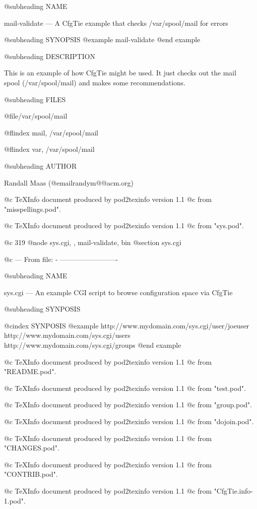 @subheading NAME


mail-validate --- A CfgTie example that checks /var/spool/mail for errors

@subheading SYNOPSIS
@example
        mail-validate
@end example

@subheading DESCRIPTION

This is an example of how CfgTie might be used.  It just checks out the mail
spool (/var/spool/mail) and makes some recommendations.

@subheading FILES

@file{/var/spool/mail}

@flindex mail, /var/spool/mail

@flindex var, /var/spool/mail

@subheading AUTHOR

Randall Maas (@email{randym@@acm.org})

@c TeXInfo document produced by pod2texinfo version 1.1
@c from "misspellings.pod".


@c TeXInfo document produced by pod2texinfo version 1.1
@c from "sys.pod".


@c 319
@node sys.cgi,  , mail-validate, bin
@section sys.cgi


@c --- From file: - -------------------------

@subheading NAME


sys.cgi --- An example CGI script to browse configuration space via CfgTie

@subheading SYNPOSIS

@cindex SYNPOSIS
@example
        http://www.mydomain.com/sys.cgi/user/joeuser
        http://www.mydomain.com/sys.cgi/users
        http://www.mydomain.com/sys.cgi/groups
@end example

@c TeXInfo document produced by pod2texinfo version 1.1
@c from "README.pod".


@c TeXInfo document produced by pod2texinfo version 1.1
@c from "test.pod".


@c TeXInfo document produced by pod2texinfo version 1.1
@c from "group.pod".


@c TeXInfo document produced by pod2texinfo version 1.1
@c from "dojoin.pod".


@c TeXInfo document produced by pod2texinfo version 1.1
@c from "CHANGES.pod".


@c TeXInfo document produced by pod2texinfo version 1.1
@c from "CONTRIB.pod".


@c TeXInfo document produced by pod2texinfo version 1.1
@c from "CfgTie.info-1.pod".


